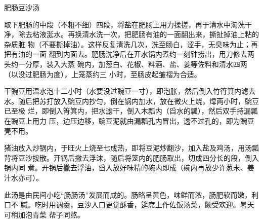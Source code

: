 \begin{recipe}{肥肠豆沙汤}

\ingredients


\preparation

\step 取下肥肠的中段（不粗不细）四段，将盐在肥肠上用力揉搓，再于清水中淘洗干
净，除去粘液涎水。再换清水洗一次，把肥肠有油的一面翻出来，撕扯掉油上粘的杂质脏
物（不要撕掉油）。这样反复清洗几次，洗至肠白，涩手，无臭味为止；再把有油的一面
翻到内面去。肥肠洗净后在开水锅内煮约一刻钟捞出，用刀修去两头约一分厚，装入大蒸
碗内，加葱白、花椒、料酒、盐、姜等佐料和清水四两（以没过肥肠为度），上笼蒸约三
小时，至肠皮起皱褶为合适。

\step 干豌豆用温水泡十二小时（水要没过豌豆一寸），即泡胀，然后倒入竹筲箕内滤去
水。随后把苏打放入豌豆内抄匀，倒在锅内加水，放在微火上烧，㸆两小时，豌豆已至极
烂，即倒入筲箕内，把水滤干，倒入木瓢内（舀水的瓢），然后双手持漏瓢在豌豆上用力
压，边压边移，豌豆泥就由漏瓢孔内冒出，透不过孔的，即为豌豆壳不用。

\step 猪油放入炒锅内，于旺火上烧至七成热，即将豆泥炒翻沙，加入盐及鸡汤，用汤瓢
背将豆沙按散。开锅后撇去浮沫，随后将笼内的肥肠取出，切成四分长的段，倒入锅内同
煮。开锅后撇去浮油，舀入放好味精的碗内即成（碗内再放少许葱末、姜汁水亦可）。

\features

此汤是由民间小吃“肠肠汤”发展而成的。肠略呈黄色，味鲜而浓，肠肥软而嫩，利口不
腻。吃时用调羹，豆沙入口更觉酥香，筵席上作佐饭汤菜，颇受欢迎。暑天可稍加泡青菜
帮子同熬。

\end{recipe}

